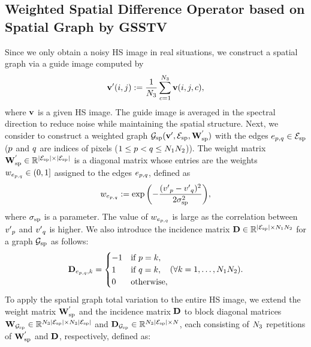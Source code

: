 \subsection{Weighted Spatial Difference Operator based on Spatial Graph by GSSTV~\cite{Takemoto2022GSSTV}}
\label{subsec:SpatialGraph}
Since we only obtain a noisy HS image in real situations, we construct a spatial graph via a guide image computed by
\begin{equation}
    \label{eq:GuideImage}
    \mathbf{v}{'}(i, j) :=  \frac{1}{N_{3}} \sum_{c=1}^{N_{3}} \mathbf{v}(i, j, c),
\end{equation}
where $\mathbf{v}$ is a given HS image.
The guide image is averaged in the spectral direction to reduce noise while maintaining the spatial structure. 
Next, we consider to construct a weighted graph $\mathcal{G}_{\text{sp}}(\mathbf{v}{'}, \mathcal{E}_{\text{sp}}, \mathbf{W}_{\text{sp}}^{'})$ with the edges $e_{p, q} \in \mathcal{E}_{\text{sp}}$ ($p$ and $q$ are indices of pixels ($1 \leq p < q \leq N_{1} N_{2}$)).
The weight matrix $\mathbf{W}_{\text{sp}}^{'} \in \mathbb{R}^{|\mathcal{E}_{\text{sp}}| \times |\mathcal{E}_{\text{sp}}|}$ is a diagonal matrix whose entries are the weights $w_{e_{p, q}} \in (0, 1]$ assigned to the edges $e_{p, q}$, defined as
\begin{equation}
    \label{eq:SpatialGraphWeight}
    w_{e_{p, q}} := \exp{\left( - \frac{( v{'}_{p} - v{'}_{q})^{2}}{2\sigma_{\text{sp}}^{2}} \right)},
\end{equation}
where $\sigma_{\text{sp}}$ is a parameter.
The value of $w_{e_{p, q}}$ is large as the correlation between $v{'}_{p}$ and $v{'}_{q}$ is higher.
We also introduce the incidence matrix $\mathbf{D} \in \mathbb{R}^{|\mathcal{E}_{\text{sp}}| \times N_{1} N_{2}}$ for a graph $\mathcal{G}_{\text{sp}}$ as follows: 
\begin{equation}
	\label{eq:SpatialGraphIncidenceMat}
	\mathbf{D}_{e_{p, q}, k} = 
	\begin{cases}
		-1 & \text{if } p = k, \\
		1 & \text{if } q = k, \\
		0 & \text{otherwise},
	\end{cases}
	(\forall k = 1, \ldots, N_{1} N_{2}).
\end{equation}
To apply the spatial graph total variation to the entire HS image, we extend the weight matrix $\mathbf{W}_{\text{sp}}^{'}$ and the incidence matrix $\mathbf{D}$ to block diagonal matrices $\mathbf{W}_{\mathcal{G}_{\text{sp}}} \in \mathbb{R}^{N_{3} |\mathcal{E}_{\text{sp}}| \times N_{3}  |\mathcal{E}_{\text{sp}}|}$ and $\mathbf{D}_{\mathcal{G}_{\text{sp}}} \in \mathbb{R}^{N_{3} |\mathcal{E}_{\text{sp}}| \times N}$, each consisting of $N_{3} $ repetitions of $\mathbf{W}_{\text{sp}}^{'}$ and $\mathbf{D}$, respectively, defined as:
